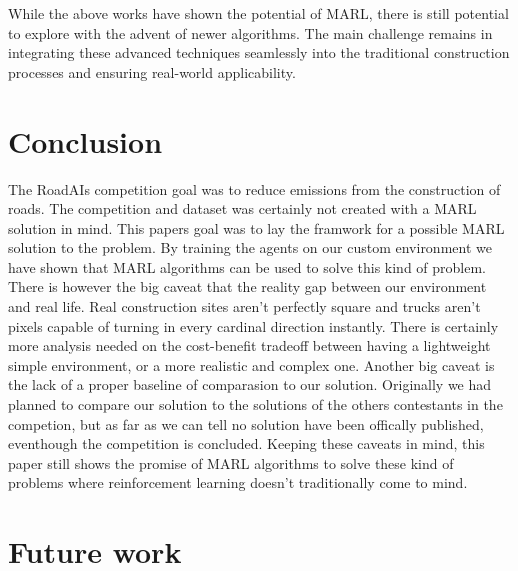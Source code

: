 \documentclass[conference]{IEEEtran}
\begin{document}
While the above works have shown the potential of MARL, there is still potential to explore with the advent of newer algorithms. The main challenge remains in integrating these advanced techniques seamlessly into the traditional construction processes and ensuring real-world applicability.

\noindent


\section{Conclusion}

The RoadAIs competition goal was to reduce \coo{} emissions from the construction of roads.
The competition and dataset was certainly not created with a MARL solution in mind.
This papers goal was to lay the framwork for a possible MARL solution to the problem.
By training the agents on our custom environment we have shown that MARL algorithms can be used to solve this  kind of problem.
There is however the big caveat that the reality gap between our environment and real life.
Real construction sites aren't perfectly square and trucks aren't pixels capable of turning in every cardinal direction instantly. There is certainly more analysis needed on the cost-benefit tradeoff between having a lightweight simple environment, or a more realistic and complex one.
Another big caveat is the lack of a proper baseline of comparasion to our solution.
Originally we had planned to compare our solution to the solutions of the others contestants in the competion, but as far as we can tell no solution have been offically published, eventhough the competition is concluded.
Keeping these caveats in mind, this paper still shows the promise of MARL algorithms to solve these kind of
problems where reinforcement learning doesn't traditionally come to mind.



\section{Future work}
\end{document}

